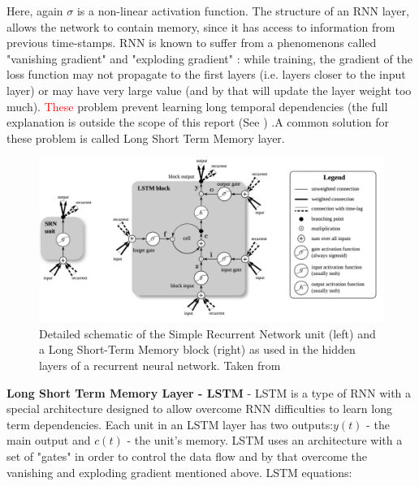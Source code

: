 \documentclass[
12pt, %
english, %
doublespacing, %
headsepline, %
]{MastersDoctoralThesis} %
\begin{document}
Here, again $\sigma $ is a non-linear activation function. The structure of an RNN layer, allows the network to contain memory, since it has access to information from previous time-stamps. RNN is known to suffer from a  phenomenons called "vanishing gradient" and "exploding gradient" \cite{pascanu2013difficulty}: while training, the gradient of the loss function may not propagate to the first layers (i.e. layers closer to the input layer) or may have very large value (and by that will update the layer weight too much). \textcolor{red}{These} problem prevent learning long temporal dependencies (the full explanation is outside the scope of this report (See \cite{bengio1994learning}) .A common solution for these problem is called Long Short Term Memory layer.

\begin{figure}
\centering
\includegraphics[width=1.0\linewidth]{LSTM_RNN_placeholder_clear.png}
\caption{Detailed schematic of the Simple Recurrent Network unit (left) and a Long Short-Term Memory block (right) as used
	in the hidden layers of a recurrent neural network. Taken from \cite{ greff2017lstm}}


\label{fig:RNN-rolled}
\end{figure}


\textbf{Long Short Term Memory Layer - LSTM} - LSTM is a type of RNN with a special architecture designed to allow overcome RNN difficulties to learn long term dependencies. Each unit in an LSTM layer has two outputs:$y(t)$ - the main output and $c(t)$ - the unit's memory. LSTM uses an architecture with a set of "gates" in order to control the data flow and by that overcome the vanishing and exploding gradient mentioned above. LSTM equations:
\end{document}
